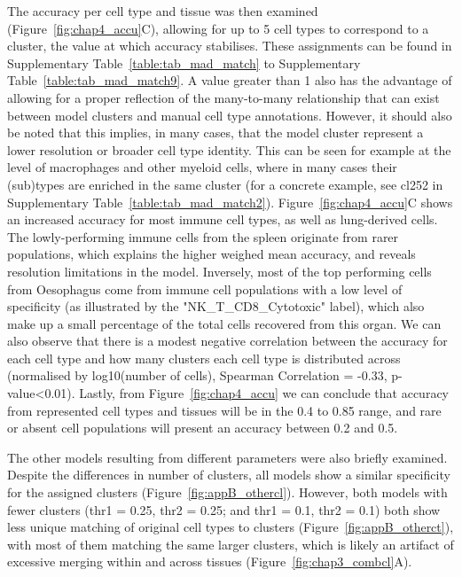 The accuracy per cell type and tissue was then examined (Figure~\ref{fig:chap4_accu}C), allowing for up to 5 cell types to correspond to a cluster, the value at which accuracy stabilises. These assignments can be found in Supplementary Table~\ref{table:tab_mad_match} to Supplementary Table~\ref{table:tab_mad_match9}. A value greater than 1 also has the advantage of allowing for a proper reflection of the many-to-many relationship that can exist between model clusters and manual cell type annotations. However, it should also be noted that this implies, in many cases, that the model cluster represent a lower resolution or broader cell type identity. This can be seen for example at the level of macrophages and other myeloid cells, where in many cases their (sub)types are enriched in the same cluster (for a concrete example, see cl252 in Supplementary Table~\ref{table:tab_mad_match2}). Figure~\ref{fig:chap4_accu}C shows an increased accuracy for most immune cell types, as well as lung-derived cells. The lowly-performing immune cells from the spleen originate from rarer populations, which explains the higher weighed mean accuracy, and reveals resolution limitations in the model. Inversely, most of the top performing cells from Oesophagus come from immune cell populations with a low level of specificity (as illustrated by the "NK\_T\_CD8\_Cytotoxic" label), which also make up a small percentage of the total cells recovered from this organ. We can also observe that there is a modest negative correlation between the accuracy for each cell type and how many clusters each cell type is distributed across (normalised by log10(number of cells), Spearman Correlation = -0.33, p-value<0.01). Lastly, from Figure~\ref{fig:chap4_accu} we can conclude that accuracy from represented cell types and tissues will be in the 0.4 to 0.85 range, and rare or absent cell populations will present an accuracy between 0.2 and 0.5.

The other models resulting from different parameters were also briefly examined. Despite the differences in number of clusters, all models show a similar specificity for the assigned clusters (Figure~\ref{fig:appB_othercl}). However, both models with fewer clusters (thr1 = 0.25, thr2 = 0.25; and thr1 = 0.1, thr2 = 0.1) both show less unique matching of original cell types to clusters (Figure~\ref{fig:appB_otherct}), with most of them matching the same larger clusters, which is likely an artifact of excessive merging within and across tissues (Figure~\ref{fig:chap3_combcl}A). 

